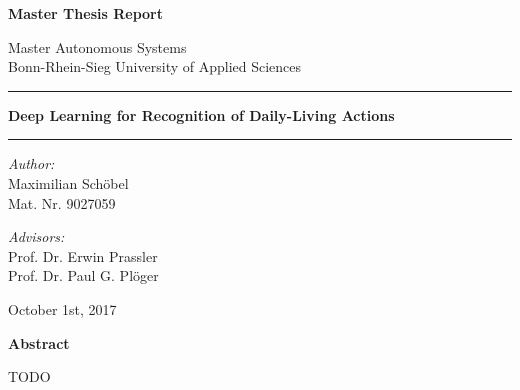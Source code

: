 \documentclass[a4paper, 11pt, listof=totoc, bibliography=totoc]{scrartcl}
\begin{document}
\thispagestyle{empty}
\begin{center}
\LARGE
\textbf{Master Thesis Report} \\
\vspace{.5cm}

\large
Master Autonomous Systems \\
Bonn-Rhein-Sieg University of Applied Sciences\\
\vspace{1cm}

\vspace{-0.75\baselineskip}\rule{\linewidth}{1.5pt}
\LARGE\textbf{Deep Learning for Recognition of Daily-Living Actions} \\
\vspace{-0.5\baselineskip}\rule{\linewidth}{1.5pt}

\vspace{1cm}

\normalsize
\textit{Author:}\\
Maximilian Schöbel\\
Mat. Nr. 9027059
\bigskip

\textit{Advisors:}\\
Prof. Dr. Erwin Prassler\\
Prof. Dr. Paul G. Plöger\\
\bigskip

October 1st, 2017

\vfill

\textbf{Abstract}
\end{center}
\small

TODO

\newpage

%

\thispagestyle{empty}
\footnotesize
\tableofcontents
\normalsize

\newpage

%
%
%
%
%







\begin{appendix}


\end{appendix}

\newpage

\end{document}
